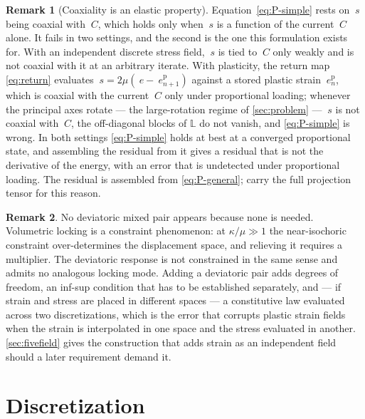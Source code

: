 \documentclass{article}
\newcommand{\C}{~C}
\newcommand{\edev}{~e}
\newcommand{\sdev}{~s}
\theoremstyle{definition}
\newtheorem{remark}{Remark}
\theoremstyle{plain}
\begin{document}
\begin{remark}[Coaxiality is an elastic property]
\label{rem:coaxial}
Equation~\eqref{eq:P-simple} rests on $\sdev$ being coaxial with $\C$, which
holds only when $\sdev$ is a function of the current $\C$ alone. It fails in
two settings, and the second is the one this formulation exists for. With an
independent discrete stress field, $\sdev$ is tied to $\C$ only weakly and is
not coaxial with it at an arbitrary iterate. With plasticity, the return map
\eqref{eq:return} evaluates
$\sdev = 2\mu(\edev - \edev^{\mathrm p}_{n+1})$ against a stored
plastic strain $\edev^{\mathrm p}_n$, which is coaxial with the current $\C$
only under proportional loading; whenever the principal axes rotate ---
the large-rotation regime of \cref{sec:problem} --- $\sdev$ is not coaxial with $\C$, the
off-diagonal blocks of $\mathbb{L}$ do not vanish, and \eqref{eq:P-simple} is
wrong. In both settings \eqref{eq:P-simple} holds at best at a converged
proportional state, and assembling the residual from it gives a residual that
is not the derivative of the energy, with an error that is undetected under
proportional loading. The residual is assembled from \eqref{eq:P-general};
\textcite{Miehe.Apel.Lambrecht:2002} carry the full projection tensor for this
reason.
\end{remark}

\begin{remark}
\label{rem:whynodev}
No deviatoric mixed pair appears because none is needed. Volumetric locking is
a constraint phenomenon: at $\kappa/\mu \gg 1$ the near-isochoric constraint
over-determines the displacement space, and relieving it requires a multiplier.
The deviatoric response is not constrained in the same sense and admits no
analogous locking mode. Adding a deviatoric pair adds degrees of freedom, an
inf-sup condition that has to be established separately, and --- if strain and
stress are placed in different spaces --- a constitutive law evaluated across
two discretizations, which is the error that corrupts plastic strain fields
when the strain is interpolated in one space and the stress evaluated in
another. \cref{sec:fivefield} gives the construction that adds strain as an
independent field should a later requirement demand it.
\end{remark}

\section{Discretization}
\label{sec:discretization}
\end{document}
